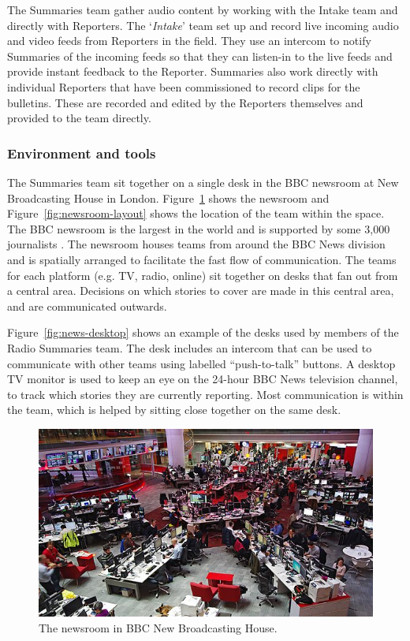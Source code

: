 The Summaries team gather audio content by working with the Intake team and directly with Reporters. The
`\textit{Intake}' team set up and record live incoming audio and video feeds from Reporters in the field. They use an
intercom to notify Summaries of the incoming feeds so that they can listen-in to the live feeds and provide instant
feedback to the Reporter.  Summaries also work directly with individual Reporters that have been commissioned to record
clips for the bulletins. These are recorded and edited by the Reporters themselves and provided to the team directly.

\subsubsection{Environment and tools}
The Summaries team sit together on a single desk in the BBC newsroom at New Broadcasting House in London.
Figure~\ref{fig:newsroom} shows the newsroom and Figure~\ref{fig:newsroom-layout} shows the location of the team within
the space. The BBC newsroom is the largest in the world and is supported by some 3,000 journalists
\citep[p.~80]{McLeish2015}.  The newsroom houses teams from around the BBC News division and is spatially arranged to
facilitate the fast flow of communication. The teams for each platform (e.g. TV, radio, online) sit together on desks
that fan out from a central area. Decisions on which stories to cover are made in this central area, and are
communicated outwards.

Figure~\ref{fig:news-desktop} shows an example of the desks used by members of the Radio Summaries team. The desk
includes an intercom that can be used to communicate with other teams using labelled ``push-to-talk'' buttons. A
desktop TV monitor is used to keep an eye on the 24-hour BBC News television channel, to track which stories they are
currently reporting. Most communication is within the team, which is helped by sitting close together on the same desk.

\begin{figure}
  \centering
  \includegraphics[width=\columnwidth]{figs/newsroom.jpg}
  \caption{The newsroom in BBC New Broadcasting House.}
  \label{fig:newsroom}
\end{figure}

